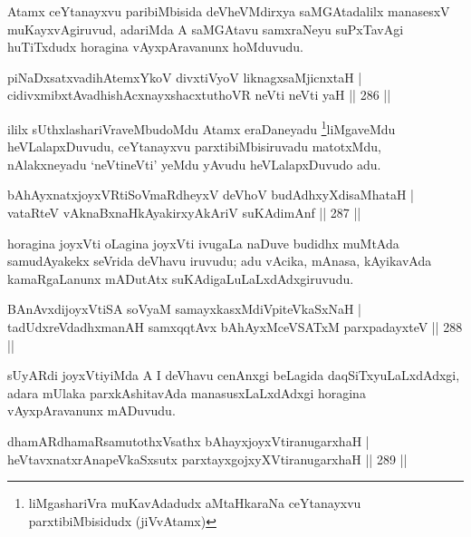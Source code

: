 \begin{artha}
Atamx ceYtanayxvu paribiMbisida deVheVMdirxya saMGAtadalilx manasesxV muKayxvAgiruvud, adariMda A saMGAtavu samxraNeyu suPxTavAgi huTiTxdudx horagina vAyxpAravanunx hoMduvudu.
\end{artha}

\begin{shl}
piNaDxsatxvadihA\s \s temxYkoV divxtiVyoV liknagxsaMjicnxtaH | \\
\footnotemark[2]{}cidivxmibxtAvadhishAcxnayxshacxtuthoVR neVti neVti yaH \hfill ||  286 ||  
\end{shl}

\begin{artha}
ililx sUthxlashariVraveMbudoMdu Atamx eraDaneyadu \footnote{liMgashariVra muKavAdadudx aMtaHkaraNa ceYtanayxvu parxtibiMbisidudx (jiVvAtamx)}liMgaveMdu heVLalapxDuvudu, ceYtanayxvu parxtibiMbisiruvadu matotxMdu, nAlakxneyadu `neVtineVti' yeMdu yAvudu heVLalapxDuvudo adu.
\end{artha}

\begin{shl}
bAhAyxnatxjoyxVRtiSoVmaRdheyxV deVhoV budAdhxyXdisaMhataH | \\
vataRteV vAknaBxnaHkAyakirxyAkAriV suKAdimAnf \hfill ||  287 ||  
\end{shl}

\begin{artha}
horagina joyxVti oLagina joyxVti ivugaLa naDuve budidhx muMtAda samudAyakekx seVrida deVhavu iruvudu; adu vAcika, mAnasa, kAyikavAda kamaRgaLanunx mADutAtx suKAdigaLuLaLxdAdxgiruvudu.
\end{artha}

\begin{shl}
BAnAvxdijoyxVtiSA soV\s yaM samayxkasxMdiVpiteVkaSxNaH | \\
tadUdxreVdadhxmanAH samxqqtAvx bAhAyxMceVSATxM parxpadayxteV \hfill ||  288 ||  
\end{shl}

\begin{artha}
sUyARdi joyxVtiyiMda A I deVhavu cenAnxgi beLagida daqSiTxyuLaLxdAdxgi, adara mUlaka parxkAshitavAda manasusxLaLxdAdxgi horagina vAyxpAravanunx mADuvudu.
\end{artha}

\begin{shl}
dhamARdhamaRsamutothxV\s sathx bAhayxjoyxVtiranugarxhaH | \\
heVtavxnatxrAnapeVkaSxsutx parxtayxgojxyXVtiranugarxhaH \hfill ||   289 ||  
\end{shl}

